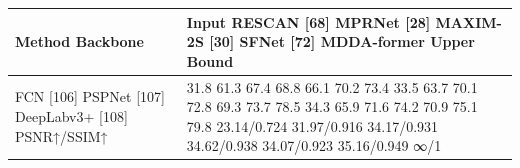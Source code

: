 \begin{tabular}{ll}
\toprule
Method Backbone & Input RESCAN [68] MPRNet [28] MAXIM-2S [30] SFNet [72] MDDA-former Upper Bound \\
\midrule
FCN [106] PSPNet [107] DeepLabv3+ [108] PSNR↑/SSIM↑ & 31.8 61.3 67.4 68.8 66.1 70.2 73.4 33.5 63.7 70.1 72.8 69.3 73.7 78.5 34.3 65.9 71.6 74.2 70.9 75.1 79.8 23.14/0.724 31.97/0.916 34.17/0.931 34.62/0.938 34.07/0.923 35.16/0.949 ∞/1 \\
\bottomrule
\end{tabular}
